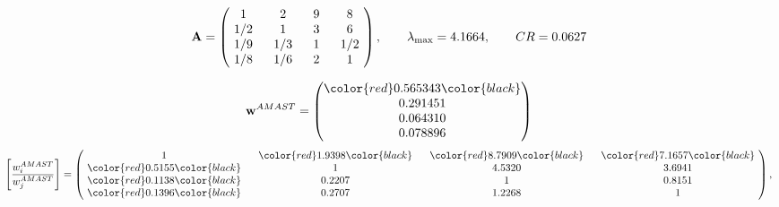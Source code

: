 \begin{example}
\begin{equation*}
\mathbf{A} =
\begin{pmatrix}
$\,\,$ 1 $\,\,$ & $\,\,$2$\,\,$ & $\,\,$9$\,\,$ & $\,\,$8 $\,\,$ \\
$\,\,$ 1/2$\,\,$ & $\,\,$ 1 $\,\,$ & $\,\,$3$\,\,$ & $\,\,$6 $\,\,$ \\
$\,\,$ 1/9$\,\,$ & $\,\,$ 1/3$\,\,$ & $\,\,$ 1 $\,\,$ & $\,\,$ 1/2 $\,\,$ \\
$\,\,$ 1/8$\,\,$ & $\,\,$ 1/6$\,\,$ & $\,\,$2$\,\,$ & $\,\,$ 1  $\,\,$ \\
\end{pmatrix},
\qquad
\lambda_{\max} =
4.1664,
\qquad
CR = 0.0627
\end{equation*}

\begin{equation*}
\mathbf{w}^{AMAST} =
\begin{pmatrix}
\color{red} 0.565343\color{black} \\
0.291451\\
0.064310\\
0.078896
\end{pmatrix}\end{equation*}
\begin{equation*}
\left[ \frac{{w}^{AMAST}_i}{{w}^{AMAST}_j} \right] =
\begin{pmatrix}
$\,\,$ 1 $\,\,$ & $\,\,$\color{red} 1.9398\color{black} $\,\,$ & $\,\,$\color{red} 8.7909\color{black} $\,\,$ & $\,\,$\color{red} 7.1657\color{black} $\,\,$ \\
$\,\,$\color{red} 0.5155\color{black} $\,\,$ & $\,\,$ 1 $\,\,$ & $\,\,$4.5320$\,\,$ & $\,\,$3.6941  $\,\,$ \\
$\,\,$\color{red} 0.1138\color{black} $\,\,$ & $\,\,$0.2207$\,\,$ & $\,\,$ 1 $\,\,$ & $\,\,$0.8151 $\,\,$ \\
$\,\,$\color{red} 0.1396\color{black} $\,\,$ & $\,\,$0.2707$\,\,$ & $\,\,$1.2268$\,\,$ & $\,\,$ 1  $\,\,$ \\
\end{pmatrix},
\end{equation*}


\end{example}
